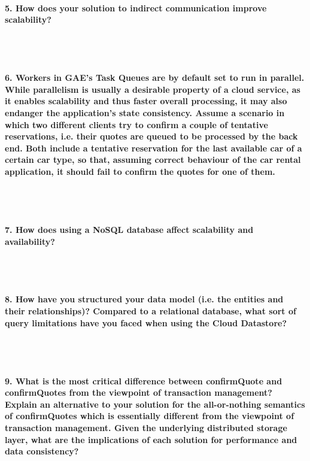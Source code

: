 \documentclass{ds-report}
\begin{document}
	\paragraph{5. How does your solution to indirect communication improve scalability?} \mbox{}\\\\


		\paragraph{6. Workers in GAE’s Task Queues are by default set to run in parallel. While parallelism is usually a desirable property of a cloud service, as it enables scalability and thus faster overall processing, it may also endanger the application’s state consistency. Assume a scenario in which two different clients try to confirm a couple of tentative reservations, i.e. their quotes are queued to be processed by the back end. Both include a tentative reservation for the last available car of a certain car type, so that, assuming correct behaviour of the car rental application, it should fail to confirm the quotes for one of them.} \mbox{}\\\\


 

	\paragraph{7.  How does using a NoSQL database affect scalability and availability?} \mbox{}\\\\




	\paragraph{8. How have you structured your data model (i.e. the entities and their relationships)? Compared to a relational database, what sort of query limitations have you faced when using the Cloud Datastore?} \mbox{}\\\\


	\paragraph{9. What is the most critical difference between confirmQuote and confirmQuotes from the viewpoint of transaction management? Explain an alternative to your solution for the all-or-nothing semantics of confirmQuotes which is essentially different from the viewpoint of transaction management. Given the underlying distributed storage layer, what are the implications of each solution for performance and data consistency?} \mbox{}\\\\
	
\end{document}
